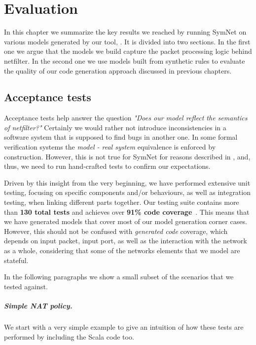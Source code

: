 \chapter{Evaluation}\label{chapter:eval}

In this chapter we summarize the key results we reached by running SymNet on
various models generated by our tool, \TOOL.  It is divided into two sections.
In the first one we argue that the models we build capture the packet
processing logic behind netfilter.  In the second one we use models built from
synthetic rules to evaluate the quality of our code generation approach
discussed in previous chapters.


\section{Acceptance tests}

Acceptance tests help answer the question \emph{"Does our model reflect the
semantics of netfilter?"}  Certainly we would rather not introduce
inconsistencies in a software system that is supposed to find bugs in another
one. In some formal verification systems the \emph{model - real system}
equivalence is enforced by construction.  However, this is not true for SymNet
for reasons described in , and, thus,
we need to run hand-crafted tests to confirm our expectations.

Driven by this insight from the very beginning, we have performed extensive
unit testing, focusing on specific components and/or behaviours, as well as
integration testing, when linking different parts together.  Our testing suite
contains more than \textbf{130 total tests} and achieves over \textbf{91\% code
coverage}~\cite{github-repo}.  This means that we have generated models that
cover most of our model generation corner cases.  However, this should not be
confused with \emph{generated code} coverage, which depends on input packet,
input port, as well as the interaction with the network as a whole, considering
that some of the networks elements that we model are stateful.

In the following paragraphs we show a small subset of the scenarios that we
tested against.

\paragraph{Simple NAT policy.}
We start with a very simple example to give an intuition of how these tests are
performed by including the Scala code too.

